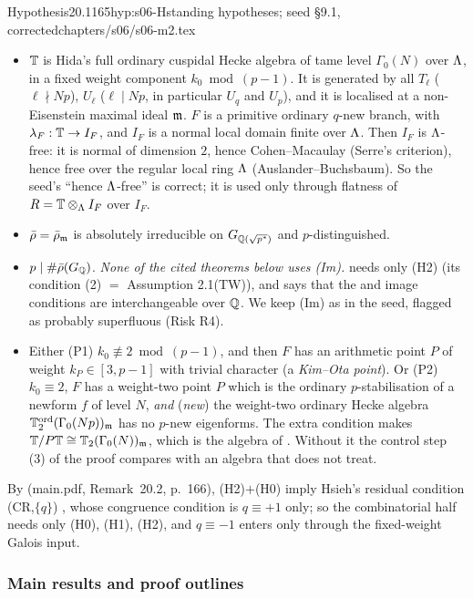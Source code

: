 \begin{quoted}{Hypothesis}{20.1}{165}{hyp:s06-H}{standing hypotheses; seed \S9.1, corrected}{chapters/s06/s06-m2.tex}
\begin{itemize}
\item[(H1)] $\mathbb{T}$ is Hida's full ordinary cuspidal Hecke algebra of tame level $\Gamma_0(N)$ over $\Lambda$, in a fixed weight component
  $k_0\bmod(p-1)$. It is generated by all $T_\ell$ ($\ell\nmid Np$), $U_\ell$ ($\ell\mid Np$, in particular $U_q$ and $U_p$), and it
  is localised at a non-Eisenstein maximal ideal $\mathfrak{m}$. $F$ is a primitive ordinary $q$-new branch, with $\lambda_F:\mathbb{T}\to I_F$, and
  $I_F$ is a normal local domain finite over $\Lambda$. Then $I_F$ is $\Lambda$-free: it is normal of dimension $2$, hence
  Cohen--Macaulay (Serre's criterion), hence free over the regular local ring $\Lambda$ (Auslander--Buchsbaum). So the seed's
  ``hence $\Lambda$-free'' is correct; it is used only through flatness of $R=\mathbb{T}\otimes_\Lambda I_F$ over $I_F$.
\item[(H2)] $\bar\rho=\bar\rho_{\mathfrak{m}}$ is absolutely irreducible on $G_{\mathbb{Q}(\sqrt{p^*})}$ and $p$-distinguished.
\item[(Im)] $p\mid\#\bar\rho(G_{\mathbb{Q}})$. \emph{None of the cited theorems below uses (Im).} \cite[Thm~1.1]{KO} needs only (H2) (its
  condition (2) $=$ Assumption 2.1(TW)), and \cite[Rem.~2.10]{KO} says that the \cite{DFG} and \cite{Dim09} image conditions are interchangeable
  over $\mathbb{Q}$. We keep (Im) as in the seed, flagged as probably superfluous (Risk R4).
\item[(P)] Either (P1) $k_0\not\equiv2\bmod(p-1)$, and then $F$ has an arithmetic point $P$ of weight $k_P\in[3,p-1]$ with trivial
  character (a \emph{Kim--Ota point}). Or (P2) $k_0\equiv2$, $F$ has a weight-two point $P$ which is the ordinary
  $p$-stabilisation of a newform $f$ of level $N$, \emph{and} (\emph{new}) the weight-two ordinary Hecke algebra
  $\mathbb{T}^{\mathrm{ord}}_2(\Gamma_0(Np))_{\mathfrak{m}}$ has no $p$-new eigenforms. The extra condition makes $\mathbb{T}/P\mathbb{T}\cong\mathbb{T}_2(\Gamma_0(N))_{\mathfrak{m}}$,
  which is the algebra of \cite{KO}. Without it the control step (3) of the proof compares with an algebra that \cite{KO} does not treat.
\end{itemize}
\sthyp
\end{quoted}

\noindent By (main.pdf, Remark~20.2, p.~166), (H2)$+$(H0) imply Hsieh's residual condition (CR,$\{q\}$) \cite[\S1.4, p.~4]{Hs}, whose congruence condition is $q\equiv+1$ only; so the
combinatorial half needs only (H0), (H1), (H2), and $q\equiv-1$ enters only through the fixed-weight Galois input.

\subsubsection*{Main results and proof outlines}

